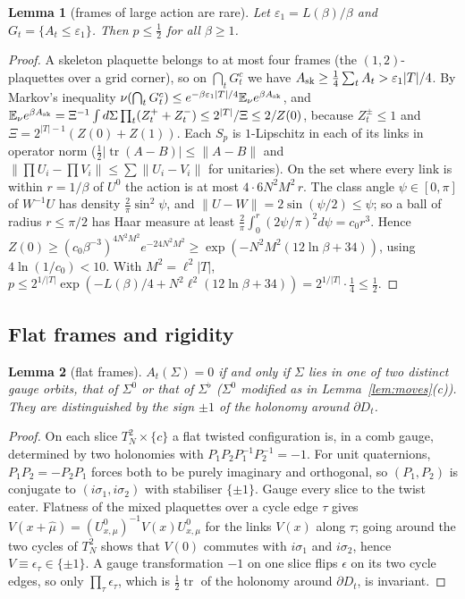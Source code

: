 \documentclass[11pt,a4paper]{article}
\newtheorem{lemma}{Lemma}[section]
\theoremstyle{definition}
\theoremstyle{remark}
\newcommand{\E}{\mathbb{E}}
\newcommand{\tr}{\operatorname{tr}}
\begin{document}
\begin{lemma}[frames of large action are rare]\label{lem:bad}
Let $\varepsilon_1=L(\beta)/\beta$ and $G_t=\{A_t\le\varepsilon_1\}$. Then $p\le\frac12$ for all $\beta\ge1$.
\end{lemma}
\begin{proof}
A skeleton plaquette belongs to at most four frames (the $(1,2)$-plaquettes over a grid corner), so on $\bigcap_tG_t^c$ we have $A_{\rm sk}\ge\frac14\sum_tA_t>\varepsilon_1|T|/4$.
By Markov's inequality $\nu(\bigcap_tG_t^c)\le e^{-\beta\varepsilon_1|T|/4}\E_\nu e^{\beta A_{\rm sk}}$, and $\E_\nu e^{\beta A_{\rm sk}}=\Xi^{-1}\int d\Sigma\prod_t(Z^+_t+Z^-_t)\le2^{|T|}/\Xi\le2/Z(0)$, because $Z^\pm_t\le1$ and $\Xi=2^{|T|-1}(Z(0)+Z(1))$.
Each $S_p$ is $1$-Lipschitz in each of its links in operator norm ($\frac12|\tr(A-B)|\le\|A-B\|$ and $\|\prod U_i-\prod V_i\|\le\sum\|U_i-V_i\|$ for unitaries).
On the set where every link is within $r=1/\beta$ of $U^0$ the action is at most $4\cdot6N^2M^2\,r$.
The class angle $\psi\in[0,\pi]$ of $W^{-1}U$ has density $\frac2\pi\sin^2\psi$, and $\|U-W\|=2\sin(\psi/2)\le\psi$; so a ball of radius $r\le\pi/2$ has Haar measure at least $\frac2\pi\int_0^r(2\psi/\pi)^2d\psi=c_0r^3$.
Hence $Z(0)\ge(c_0\beta^{-3})^{4N^2M^2}e^{-24N^2M^2}\ge\exp(-N^2M^2(12\ln\beta+34))$, using $4\ln(1/c_0)<10$.
With $M^2=\ell^2|T|$, $p\le2^{1/|T|}\exp(-L(\beta)/4+N^2\ell^2(12\ln\beta+34))=2^{1/|T|}\cdot\frac14\le\frac12$.
\end{proof}

\subsection{Flat frames and rigidity}

\begin{lemma}[flat frames]\label{lem:flat}
$A_t(\Sigma)=0$ if and only if $\Sigma$ lies in one of two distinct gauge orbits, that of $\Sigma^0$ or that of $\Sigma^\flat$ ($\Sigma^0$ modified as in Lemma~\ref{lem:moves}(c)). They are distinguished by the sign $\pm1$ of the holonomy around $\partial D_t$.
\end{lemma}
\begin{proof}
On each slice $T^2_N\times\{c\}$ a flat twisted configuration is, in a comb gauge, determined by two holonomies with $P_1P_2P_1^{-1}P_2^{-1}=-1$.
For unit quaternions, $P_1P_2=-P_2P_1$ forces both to be purely imaginary and orthogonal, so $(P_1,P_2)$ is conjugate to $(i\sigma_1,i\sigma_2)$ with stabiliser $\{\pm1\}$.
Gauge every slice to the twist eater. Flatness of the mixed plaquettes over a cycle edge $\tau$ gives $V(x+\hat\mu)=(U^0_{x,\mu})^{-1}V(x)U^0_{x,\mu}$ for the links $V(x)$ along $\tau$; going around the two cycles of $T^2_N$ shows that $V(0)$ commutes with $i\sigma_1$ and $i\sigma_2$, hence $V\equiv\epsilon_\tau\in\{\pm1\}$.
A gauge transformation $-1$ on one slice flips $\epsilon$ on its two cycle edges, so only $\prod_\tau\epsilon_\tau$, which is $\frac12\tr$ of the holonomy around $\partial D_t$, is invariant.
\end{proof}
\end{document}
